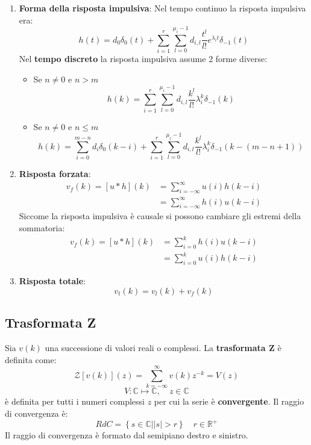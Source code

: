 \documentclass[a4paper]{article}
\begin{document}
\begin{enumerate}
  \item \textbf{Forma della risposta impulsiva}:
    Nel tempo continuo la risposta impulsiva era:
    \[
      h(t) = d_0 \delta_0(t) + \sum_{i=1}^{r} \sum_{l=0}^{\mu_i - 1} d_{i,l}
      \frac{t^l}{l!} e^{\lambda_i t} \delta_{-1}(t)
    \] 
    Nel \textbf{tempo discreto} la risposta impulsiva assume 2 forme diverse:
    \begin{itemize}
      \item Se \( n \neq 0 \) e \( n > m  \) 
        \[
          h(k) = \sum_{i=1}^{r} \sum_{l=0}^{\mu_i - 1} d_{i,l} \frac{k^l}{l!} \lambda_i^k
          \delta_{-1}(k)
        \] 
      \item Se \( n \neq 0 \) e \( n \le m \) 
        \[
          h(k) = \sum_{i=0}^{m-n} d_i \delta_0(k-i) + \sum_{i=1}^{r} \sum_{l=0}^{\mu_i - 1}
          d_{i,l} \frac{k^l}{l!} \lambda_i^k \delta_{-1}(k - (m - n + 1))
        \] 
    \end{itemize}

  \item \textbf{Risposta forzata}:
    \[
      \begin{aligned}
        v_f(k) = [u \ast h](k) &= \sum_{i=-\infty}^{\infty} u(i) h(k-i)\\
                               &= \sum_{i=-\infty}^{\infty} h(i) u(k-i)
      \end{aligned}
    \] 
    Siccome la risposta impulsiva è causale si possono cambiare gli estremi della sommatoria:
    \[
      \begin{aligned}
        v_f(k) = [u \ast h](k) &= \sum_{i=0}^{k} h(i) u(k-i)\\
               &= \sum_{i=0}^{k} u(i) h(k-i)
      \end{aligned}
    \]

  \item \textbf{Risposta totale}:
    \[
      v_t(k) = v_l(k) + v_f(k)
    \] 
\end{enumerate}

\subsection{Trasformata Z}
\begin{definition}
  Sia \( v(k) \) una successione di valori reali o complessi. La \textbf{trasformata Z}
  è definita come:
  \[
    \mathcal{Z}\left[ v(k) \right](z) = \sum_{k=-\infty}^{\infty} v(k) z^{-k} = V(z)
  \] 
  \[
    V: \mathbb{C} \mapsto \mathbb{C}, \quad z \in \mathbb{C}
  \] 
  è definita per tutti i numeri complessi \( z \) per cui la serie è \textbf{convergente}.
  Il raggio di convergenza è:
  \[
    RdC = \left\{ s \in \mathbb{C} | |s| > r \right\} \quad r \in \mathbb{R}^+
  \] 
  Il raggio di convergenza è formato dal semipiano destro e sinistro.
\end{definition}
\end{document}

